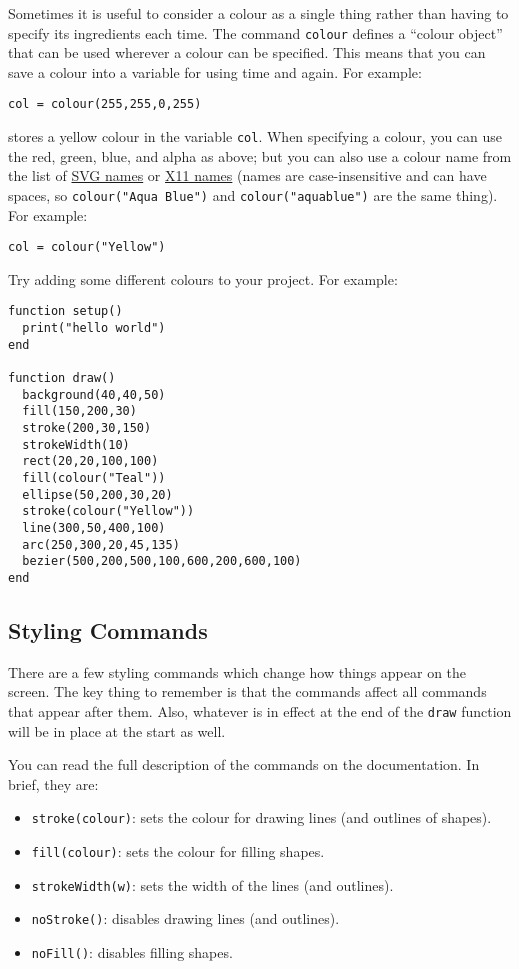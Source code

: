 \documentclass[
  xhtml,%
  use filename%
]{internet}
\begin{document}
Sometimes it is useful to consider a colour as a single thing rather than having to specify its ingredients each time.
The command \verb+colour+ defines a ``colour object'' that can be used wherever a colour can be specified.
This means that you can save a colour into a variable for using time and again.
For example:

\begin{verbatim}
col = colour(255,255,0,255)
\end{verbatim}

\noindent stores a yellow colour in the variable \verb+col+.
When specifying a colour, you can use the red, green, blue, and alpha as above; but you can also use a colour name from the list of \href{https://en.wikipedia.org/wiki/Web_colors#X11_color_names}{SVG names} or \href{http://raebear.net/comp/emacscolors.html}{X11 names} (names are case-insensitive and can have spaces, so \verb+colour("Aqua Blue")+ and \verb+colour("aquablue")+ are the same thing).
For example:

\begin{verbatim}
col = colour("Yellow")
\end{verbatim}

Try adding some different colours to your project.
For example:

\begin{verbatim}
function setup()
  print("hello world")
end

function draw()
  background(40,40,50)
  fill(150,200,30)
  stroke(200,30,150)
  strokeWidth(10)
  rect(20,20,100,100)
  fill(colour("Teal"))
  ellipse(50,200,30,20)
  stroke(colour("Yellow"))
  line(300,50,400,100)
  arc(250,300,20,45,135)
  bezier(500,200,500,100,600,200,600,100)
end
\end{verbatim}

\subsection{Styling Commands}

There are a few styling commands which change how things appear on the screen.
The key thing to remember is that the commands affect all commands that appear after them.
Also, whatever is in effect at the end of the \verb+draw+ function will be in place at the start as well.

You can read the full description of the commands on the documentation.
In brief, they are:

\begin{itemize}
\item \verb+stroke(colour)+: sets the colour for drawing lines (and outlines of shapes).
\item \verb+fill(colour)+: sets the colour for filling shapes.
\item \verb+strokeWidth(w)+: sets the width of the lines (and outlines).
\item \verb+noStroke()+: disables drawing lines (and outlines).
\item \verb+noFill()+: disables filling shapes.
\end{itemize}
\end{document}
